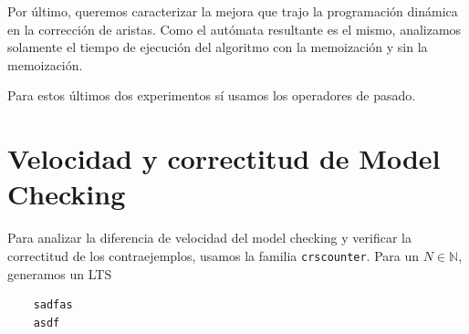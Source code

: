 Por último, queremos caracterizar la mejora que trajo la programación dinámica en la corrección de aristas. Como el autómata resultante es el mismo, analizamos solamente el tiempo de ejecución del algoritmo con la memoización y sin la memoización. 

Para estos últimos dos experimentos sí usamos los operadores de pasado.

\section{Velocidad y correctitud de Model Checking}

Para analizar la diferencia de velocidad del model checking y verificar la correctitud de los contraejemplos, usamos la familia \texttt{crscounter}. Para un $N \in \mathbb{N}$, generamos un LTS 

\begin{lstlisting}
	sadfas 
	asdf
	 
\end{lstlisting}
